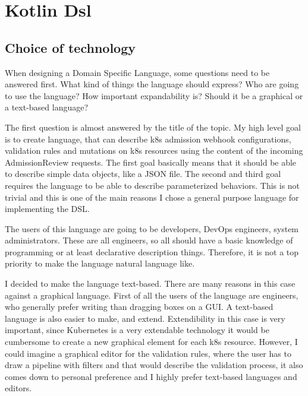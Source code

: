 \setlength{\parindent}{0pt}
\setlength{\parskip}{0.6em}

\chapter{Kotlin Dsl}
\label{chap:dsl}

\section{Choice of technology}

When designing a Domain Specific Language, some questions need to be answered first. What kind of things the language should express? Who are going to use the language? How important expandability is? Should it be a graphical or a text-based language?

The first question is almost answered by the title of the topic. My high level goal is to create language, that can describe k8s admission webhook configurations, validation rules and mutations on k8s resources using the content of the incoming AdmissionReview requests. The first goal basically means that it should be able to describe simple data objects, like a JSON file. The second and third goal requires the language to be able to describe parameterized behaviors. This is not trivial and this is one of the main reasons I chose a general purpose language for implementing the DSL.

The users of this language are going to be developers, DevOps engineers, system administrators. These are all engineers, so all should have a basic knowledge of programming or at least declarative description things. Therefore, it is not a top priority to make the language natural language like.

I decided to make the language text-based. There are many reasons in this case against a graphical language. First of all the users of the language are engineers, who generally prefer writing than dragging boxes on a GUI. A text-based language is also easier to make, and extend. Extendibility in this case is very important, since Kubernetes is a very extendable technology it would be cumbersome to create a new graphical element for each k8s resource. However, I could imagine a graphical editor for the validation rules, where the user has to draw a pipeline with filters and that would describe the validation process, it also comes down to personal preference and I highly prefer text-based languages and editors.

